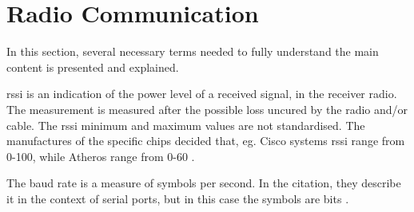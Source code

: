 \section{Radio Communication}\label{sec:radio-communication}
In this section, several necessary terms needed to fully understand the main content is presented and explained.

\begin{description}[style=nextline]
    \item[Transmission power] 
    \item[\gls{rssi}] \gls{rssi} is an indication of the power level of a received signal, in the receiver radio. The measurement is measured after the possible loss uncured by the radio and/or cable. The \gls{rssi} minimum and maximum values are not standardised. The manufactures of the specific chips decided that, eg. Cisco systems \gls{rssi} range from 0-100, while Atheros range from 0-60 \cite{website:rssi-metageek}.
    \item[Baud rate] The baud rate is a measure of symbols per second. In the citation, they describe it in the context of serial ports, but in this case the symbols are bits \cite{website:baudrate-mathworks}.
\end{description}